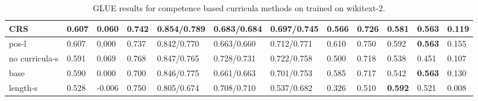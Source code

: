 \begin{table}[h]
{\begin{tabular}{|l|l|l|l|l|l|l|l|l|l|l|l|}
CRS & 0.607 & 0.060 & 0.742 & 0.854/0.789 & 0.683/0.684 & 0.697/0.745 & 0.566 & 0.726 & 0.581 & \textbf{0.563} & 0.119 \\\hline
pos-l & 0.607 & 0.000 & 0.737 & 0.842/0.770 & 0.663/0.660 & 0.712/0.771 & 0.610 & 0.750 & 0.592 & \textbf{0.563} & 0.155 \\\hline
no curricula-s & 0.591 & 0.069 & 0.768 & 0.847/0.765 & 0.728/0.731 & 0.722/0.758 & 0.500 & 0.718 & 0.538 & 0.451 & 0.107 \\\hline
base & 0.590 & 0.000 & 0.700 & 0.846/0.775 & 0.661/0.663 & 0.701/0.753 & 0.585 & 0.717 & 0.542 & \textbf{0.563} & 0.130 \\\hline
length-s & 0.528 & -0.006 & 0.750 & 0.805/0.674 & 0.708/0.710 & 0.537/0.682 & 0.326 & 0.510 & \textbf{0.592} & 0.521 & 0.008 \\ \hline
\end{tabular}%
}
\caption{GLUE results for competence based curricula methods on trained on wikitext-2.}
\label{tab:wiki2-glue}
\end{table}

